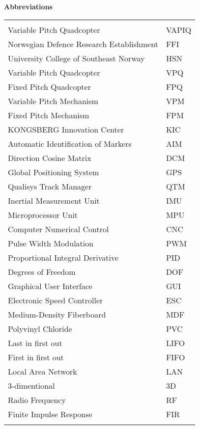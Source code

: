 \begin{center}
\textbf{\large Abbreviations}\\
\begin{tabular}{l|l}
\rowcolor{cadetgrey}
 & \\
Variable Pitch Quadcopter   & VAPIQ\\\rowcolor{gainsboro}
Norwegian Defence Research Establishment  & FFI\\
University College of Southeast Norway & HSN \\\rowcolor{gainsboro}
Variable Pitch Quadcopter & VPQ\\\rowcolor{gainsboro}
Fixed Pitch Quadcopter & FPQ\\
Variable Pitch Mechanism & VPM\\\rowcolor{gainsboro}
Fixed Pitch Mechanism & FPM\\
KONGSBERG Innovation Center & KIC \\\rowcolor{gainsboro}
Automatic Identification of Markers & AIM\\
Direction Cosine Matrix & DCM \\\rowcolor{gainsboro}
Global Positioning System & GPS \\
Qualisys Track Manager & QTM \\\rowcolor{gainsboro}
Inertial Measurement Unit & IMU \\
Microprocessor Unit & MPU \\\rowcolor{gainsboro}
Computer Numerical Control & CNC \\
Pulse Width Modulation & PWM \\\rowcolor{gainsboro}
Proportional Integral Derivative & PID \\
Degrees of Freedom & DOF \\\rowcolor{gainsboro}
Graphical User Interface & GUI \\
Electronic Speed Controller & ESC \\\rowcolor{gainsboro}
Medium-Density Fiberboard & MDF \\
Polyvinyl Chloride & PVC \\\rowcolor{gainsboro}
Last in first out & LIFO \\
First in first out & FIFO \\\rowcolor{gainsboro}
Local Area Network & LAN \\
3-dimentional & 3D \\\rowcolor{gainsboro}
Radio Frequency & RF \\
Finite Impulse Response & FIR \\\rowcolor{gainsboro}

\end{tabular}
\end{center}
